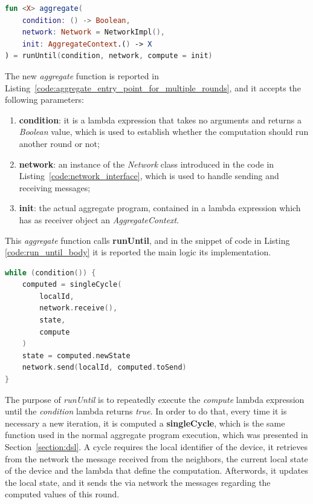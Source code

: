 \begin{lstlisting}[caption={Aggregate programming entry point used to compute multiple rounds}, captionpos=b, language=Kotlin, label={code:aggregate_entry_point_for_multiple_rounds}]
fun <X> aggregate(
    condition: () -> Boolean,
    network: Network = NetworkImpl(),
    init: AggregateContext.() -> X
) = runUntil(condition, network, compute = init)
\end{lstlisting}

The new \textit{aggregate} function is reported in Listing~\ref{code:aggregate_entry_point_for_multiple_rounds}, and it accepts the following parameters:
\begin{enumerate}
    \item \textbf{condition}: it is a lambda expression that takes no arguments and returns a \textit{Boolean} value, which is used to establish whether the computation should run another round or not;
    \item \textbf{network}: an instance of the \textit{Network} class introduced in the code in Listing~\ref{code:network_interface}, which is used to handle sending and receiving messages;
    \item \textbf{init}: the actual aggregate program, contained in a lambda expression which has as receiver object an \textit{AggregateContext}.
\end{enumerate}

This \textit{aggregate} function calls \textbf{runUntil},  and in the snippet of code in Listing \ref{code:run_until_body} it is reported the main logic its implementation.
\begin{lstlisting}[caption={Main logic of the \textit{runUntil} function}, captionpos=b, language=Kotlin, label={code:run_until_body}]
while (condition()) {
    computed = singleCycle(
        localId,
        network.receive(),
        state,
        compute
    )
    state = computed.newState
    network.send(localId, computed.toSend)
}
\end{lstlisting}

The purpose of \textit{runUntil} is to repeatedly execute the \textit{compute} lambda expression until the \textit{condition} lambda returns \textit{true}.\newline
In order to do that, every time it is necessary a new iteration, it is computed a \textbf{singleCycle}, which is the same function used in the normal aggregate program execution, which was presented in Section~\ref{section:dsl}. A cycle requires the local identifier of the device, it retrieves from the network the message received from the neighbors, the current local state of the device and the lambda that define the computation.\newline
Afterwords, it updates the local state, and it sends the via network the messages regarding the computed values of this round.

